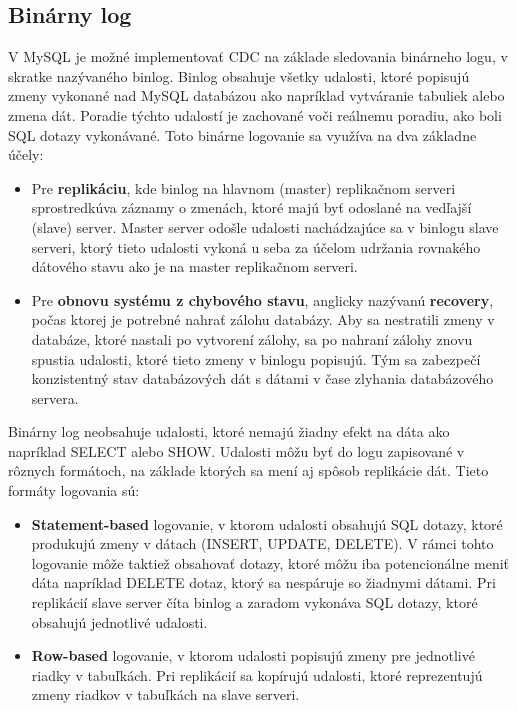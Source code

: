 \subsection{Binárny log} \label{mysql:binlog}
V MySQL je možné implementovať CDC na základe sledovania binárneho logu, v skratke nazývaného binlog\cite{mysql:reference_manual}. Binlog obsahuje všetky udalosti, ktoré popisujú zmeny vykonané nad MySQL databázou ako napríklad vytváranie tabuliek alebo zmena dát. Poradie týchto udalostí je zachované voči reálnemu poradiu, ako boli SQL dotazy vykonávané. Toto binárne logovanie sa využíva na dva základne účely:
\begin{itemize}
\item Pre \textbf{replikáciu}, kde binlog na hlavnom (master) replikačnom serveri sprostredkúva záznamy o zmenách, ktoré majú byť odoslané na vedľajší (slave) server. Master server odošle udalosti nachádzajúce sa v binlogu slave serveri, ktorý tieto udalosti vykoná u seba za účelom udržania rovnakého dátového stavu ako je na master replikačnom serveri.
\item Pre \textbf{obnovu systému z chybového stavu}, anglicky nazývanú \textbf{recovery}, počas ktorej je potrebné nahrať zálohu databázy. Aby sa nestratili zmeny v databáze, ktoré nastali po vytvorení zálohy, sa po nahraní zálohy znovu spustia udalosti, ktoré tieto zmeny v binlogu popisujú. Tým sa zabezpečí konzistentný stav databázových dát s dátami v čase zlyhania databázového servera.
\end{itemize}

Binárny log neobsahuje udalosti, ktoré nemajú žiadny efekt na dáta ako napríklad  SELECT alebo SHOW. Udalosti môžu byť do logu zapisované v rôznych formátoch, na základe ktorých sa mení aj spôsob replikácie dát. Tieto formáty logovania sú:
\begin{itemize}
\item \textbf{Statement-based} logovanie, v ktorom udalosti obsahujú SQL dotazy, ktoré produkujú zmeny v dátach (INSERT, UPDATE, DELETE). V rámci tohto logovanie môže taktiež obsahovať dotazy, ktoré môžu iba potencionálne meniť dáta napríklad DELETE dotaz, ktorý sa nespáruje so žiadnymi dátami. Pri replikácií slave server číta binlog a zaradom vykonáva SQL dotazy, ktoré obsahujú jednotlivé udalosti.
\item \textbf{Row-based} logovanie, v ktorom udalosti popisujú zmeny pre jednotlivé riadky v tabuľkách. Pri replikácií sa kopírujú udalosti, ktoré reprezentujú zmeny riadkov v tabuľkách na slave serveri. 
\end{itemize}

